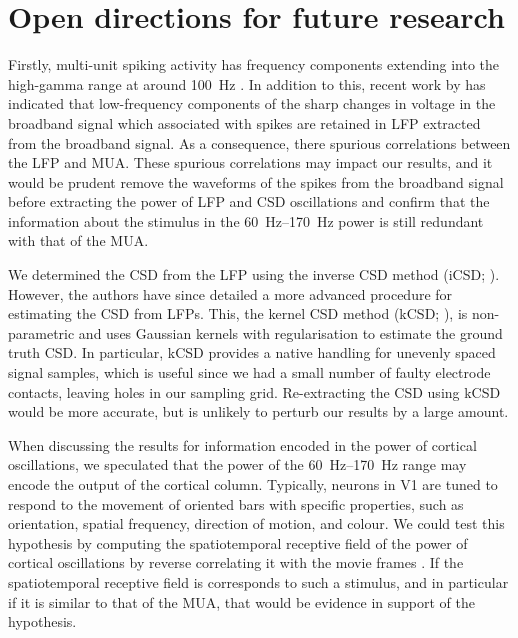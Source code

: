 \section{Open directions for future research}

Firstly, multi-unit spiking activity has frequency components extending into the high-gamma range at around \SI{100}{Hz} \citep{Einevoll2013}.
In addition to this, recent work by \citet{Zanos2011} has indicated that low-frequency components of the sharp changes in voltage in the broadband signal which associated with spikes are retained in \ac{LFP} extracted from the broadband signal.
As a consequence, there spurious correlations between the \ac{LFP} and \ac{MUA}.
These spurious correlations may impact our results, and it would be prudent remove the waveforms of the spikes from the broadband signal before extracting the power of \ac{LFP} and \ac{CSD} oscillations \citep{Zanos2011} and confirm that the information about the stimulus in the \SIrange{60}{170}{Hz} power is still redundant with that of the \ac{MUA}.

We determined the \ac{CSD} from the \ac{LFP} using the inverse \ac{CSD} method (iCSD; \citealp{Pettersen2006}).
However, the authors have since detailed a more advanced procedure for estimating the \ac{CSD} from \acp{LFP}.
This, the kernel \acl{CSD} method (kCSD; \citealp{Potworowski2012}), is non-parametric and uses Gaussian kernels with regularisation to estimate the ground truth \ac{CSD}.
In particular, kCSD provides a native handling for unevenly spaced signal samples, which is useful since we had a small number of faulty electrode contacts, leaving holes in our sampling grid.
Re-extracting the \ac{CSD} using kCSD would be more accurate, but is unlikely to perturb our results by a large amount.

When discussing the results for information encoded in the power of cortical oscillations, we speculated that the power of the \SIrange{60}{170}{Hz} range may encode the output of the cortical column.
Typically, neurons in \ac{V1} are tuned to respond to the movement of oriented bars with specific properties, such as orientation, spatial frequency, direction of motion, and colour.
We could test this hypothesis by computing the spatiotemporal receptive field of the power of cortical oscillations by reverse correlating it with the movie frames \citep{Theunissen2001}.
If the spatiotemporal receptive field is corresponds to such a stimulus, and in particular if it is similar to that of the \ac{MUA}, that would be evidence in support of the hypothesis.

